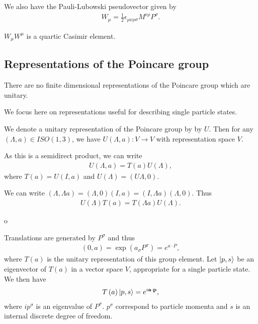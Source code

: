 We also have the Pauli-Lubowski pseudovector given by
\begin{align}
    W_{\mu} = \frac{1}{2} \epsilon_{\mu \nu \rho \sigma} M^{\nu \rho} P^{\sigma}
.\end{align}

$W_{\mu} W^{\mu}$ is a quartic Casimir element.

\subsection{Representations of the Poincare group}

There are no finite dimensional representations of the Poincare group which are unitary.

We focus here on representations useful for describing single particle states.

We denote a unitary representation of the Poincare group by by $U$. Then for any $\left( \Lambda, a \right) \in ISO \left( 1,3 \right) $, we have $U \left( \Lambda ,a \right) : V \to V$ with representation space $V$.

As this is a semidirect product, we can write
\begin{align}
    U \left( \Lambda, a \right) = T\left( a \right) U \left( \Lambda \right)
,\end{align}
where $T \left( a \right) = U \left( I,a \right) $ and $U \left( \Lambda \right) = \left( U \Lambda, 0 \right) $.

\begin{note}
    We can write $\left( \Lambda, \Lambda a \right) = \left( \Lambda, 0 \right) ( I, a) = \left( I, \Lambda a \right) \left( \Lambda, 0 \right) $. Thus
    \begin{align}
        U \left( \Lambda \right) T \left( a \right) = T\left( \Lambda a \right) U \left( \Lambda \right) 
    .\end{align}
\end{note}o

Translations are generated by $P^{\sigma}$ and thus
\begin{align}
    \left( 0,a \right) = \exp \left( a_\sigma P^{\sigma} \right)  = e^{a \cdot P}
,\end{align}
where $T \left( a \right) $ is the unitary representation of this group element. Let $\ket{p,s}$ be an eigenvector of $T \left( a \right) $ in a vector space $V$, appropriate for a single particle state. We then have
\begin{align}
    T \left( a \right) \ket{p,s} = e^{i \vb{a} \cdot \vb{p}}
,\end{align}
where $i p^{\sigma}$ is an eigenvalue of $P^{\sigma}$. $p^{\sigma}$ correspond to particle momenta and $s$ is an internal discrete degree of freedom.


